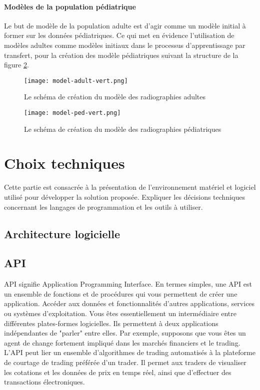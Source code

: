     \paragraph*{Modèles de la population pédiatrique} Le but de modèle de la population adulte est d'agir comme un modèle initial à former sur les données pédiatriques.
    Ce qui met en évidence l'utilisation de modèles adultes comme modèles initiaux dans le processus d'apprentissage par transfert, pour la création des modèle pédiatriques suivant la structure de la figure \ref{fig:pedia_model_schema}.

    \begin{figure}[H]
        \centering
        \texttt{[image: model-adult-vert.png]}
        \caption{Le schéma de création du modèle des radiographies adultes}\label{fig:adulte_model_schema}
    \end{figure}
    

    \begin{figure}[H]
        \centering
        \texttt{[image: model-ped-vert.png]}
        \caption{Le schéma de création du modèle des radiographies pédiatriques}\label{fig:pedia_model_schema}
    \end{figure}
\section{Choix techniques}
Cette partie est consacrée à la présentation de l'environnement matériel et logiciel utilisé pour développer la solution proposée. Expliquer les décisions techniques concernant les langages de programmation et les outils à utiliser.
    \subsection{Architecture logicielle}
    \subsection{API}
    API signifie Application Programming Interface. En termes simples, une API est un ensemble de fonctions et de procédures qui vous permettent de créer une application. Accéder aux données et fonctionnalités d'autres applications, services ou systèmes d'exploitation. 
    Vous êtes essentiellement un intermédiaire entre différentes plates-formes logicielles. Ils permettent à deux applications indépendantes de "parler" entre elles. 
    Par exemple, supposons que vous êtes un agent de change fortement impliqué dans les marchés financiers et le trading. L'API peut lier un ensemble d'algorithmes de trading automatisés à la plateforme de courtage de trading préférée d'un trader. Il permet aux traders de visualiser les cotations et les données de prix en temps réel, ainsi que d'effectuer des transactions électroniques.

